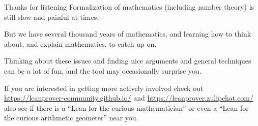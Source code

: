 \documentclass{beamer}
\theoremstyle{plain}
\begin{document}
\begin{frame}{Thanks for listening}
    Formalization of mathematics (including number theory) is still slow and painful at times.

    But we have several thousand years of mathematics, and learning how to think about, and explain mathematics, to catch up on.

    Thinking about these issues and finding nice arguments and general techniques can be a lot of fun, and the tool may occasionally surprise you.

    If you are interested in getting more actively involved check out 
    \url{https://leanprover-community.github.io/}
    and
    \url{https://leanprover.zulipchat.com/}
    also see if there is a ``Lean for the curious mathematician'' or even a ``Lean for the curious arithmetic geometer'' near you.
\end{frame}




\newcommand{\comment}[2]{#2}
\end{document}
